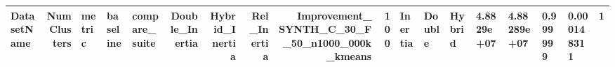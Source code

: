 \begin{tabular}{lrlllrrrrr}
\toprule
DatasetName & NumClusters & metric & baseline & compare_suite & Double_Inertia & Hybrid_Inertia & Rel_Inertia & Improvement_%
\midrule
SYNTH_C_30_F_50_n1000_000k_kmeans & 100 & Inertia & Double & Hybrid & 4.8829e+07 & 4.88289e+07 & 0.999999 & 0.000148311 & 1 \\
\bottomrule
\end{tabular}

